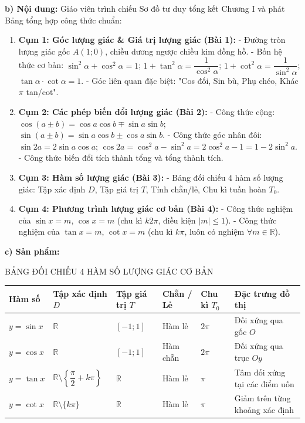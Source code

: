 \documentclass[12pt, a4paper]{article}
\begin{document}
\noindent \textbf{b) Nội dung:}  
Giáo viên trình chiếu Sơ đồ tư duy tổng kết Chương I và phát Bảng tổng hợp công thức chuẩn:  
\begin{enumerate}[leftmargin=0.6cm]  
    \item \textbf{Cụm 1: Góc lượng giác \& Giá trị lượng giác (Bài 1):}  
    - Đường tròn lượng giác gốc $A(1; 0)$, chiều dương ngược chiều kim đồng hồ.  
    - Bốn hệ thức cơ bản: $\sin^2\alpha + \cos^2\alpha = 1$; $1 + \tan^2\alpha = \dfrac{1}{\cos^2\alpha}$; $1 + \cot^2\alpha = \dfrac{1}{\sin^2\alpha}$; $\tan\alpha \cdot \cot\alpha = 1$.  
    - Góc liên quan đặc biệt: "Cos đối, Sin bù, Phụ chéo, Khác $\pi$ tan/cot".  
    \item \textbf{Cụm 2: Các phép biến đổi lượng giác (Bài 2):}  
    - Công thức cộng: $\cos(a \pm b) = \cos a \cos b \mp \sin a \sin b$; $\sin(a \pm b) = \sin a \cos b \pm \cos a \sin b$.  
    - Công thức góc nhân đôi: $\sin 2a = 2\sin a \cos a$; $\cos 2a = \cos^2 a - \sin^2 a = 2\cos^2 a - 1 = 1 - 2\sin^2 a$.  
    - Công thức biến đổi tích thành tổng và tổng thành tích.  
    \item \textbf{Cụm 3: Hàm số lượng giác (Bài 3):}  
    - Bảng đối chiếu 4 hàm số lượng giác: Tập xác định $D$, Tập giá trị $T$, Tính chẵn/lẻ, Chu kì tuần hoàn $T_0$.  
    \item \textbf{Cụm 4: Phương trình lượng giác cơ bản (Bài 4):}  
    - Công thức nghiệm của $\sin x = m$, $\cos x = m$ (chu kì $k2\pi$, điều kiện $|m| \le 1$).  
    - Công thức nghiệm của $\tan x = m$, $\cot x = m$ (chu kì $k\pi$, luôn có nghiệm $\forall m \in \mathbb{R}$).  
\end{enumerate}  
  
\noindent \textbf{c) Sản phẩm:}  
  
\begin{pedabox}{BẢNG ĐỐI CHIẾU 4 HÀM SỐ LƯỢNG GIÁC CƠ BẢN}  
\small  
\begin{tabularx}{\textwidth}{|l|X|X|l|l|l|}  
\hline  
\textbf{Hàm số} & \textbf{Tập xác định $D$} & \textbf{Tập giá trị $T$} & \textbf{Chẵn / Lẻ} & \textbf{Chu kì $T_0$} & \textbf{Đặc trưng đồ thị} \\ \hline  
$y = \sin x$ & $\mathbb{R}$ & $[-1; 1]$ & Hàm lẻ & $2\pi$ & Đối xứng qua gốc $O$ \\ \hline  
$y = \cos x$ & $\mathbb{R}$ & $[-1; 1]$ & Hàm chẵn & $2\pi$ & Đối xứng qua trục $Oy$ \\ \hline  
$y = \tan x$ & $\mathbb{R} \setminus \left\{\dfrac{\pi}{2} + k\pi\right\}$ & $\mathbb{R}$ & Hàm lẻ & $\pi$ & Tâm đối xứng tại các điểm uốn \\ \hline  
$y = \cot x$ & $\mathbb{R} \setminus \{k\pi\}$ & $\mathbb{R}$ & Hàm lẻ & $\pi$ & Giảm trên từng khoảng xác định \\ \hline  
\end{tabularx}  
\end{pedabox}  
  
\end{document}
